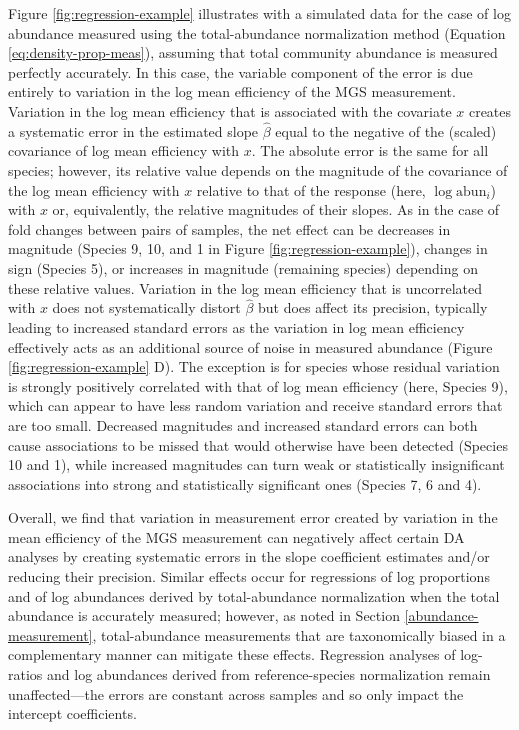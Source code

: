 \documentclass[
]{article}
\begin{document}
Figure \ref{fig:regression-example} illustrates with a simulated data for the case of log abundance measured using the total-abundance normalization method (Equation \eqref{eq:density-prop-meas}), assuming that total community abundance is measured perfectly accurately.
In this case, the variable component of the error is due entirely to variation in the log mean efficiency of the MGS measurement.
Variation in the log mean efficiency that is associated with the covariate \(x\) creates a systematic error in the estimated slope \(\hat \beta\) equal to the negative of the (scaled) covariance of log mean efficiency with \(x\).
The absolute error is the same for all species; however, its relative value depends on the magnitude of the covariance of the log mean efficiency with \(x\) relative to that of the response (here, \(\log \text{abun}_{i}\)) with \(x\) or, equivalently, the relative magnitudes of their slopes.
As in the case of fold changes between pairs of samples, the net effect can be decreases in magnitude (Species 9, 10, and 1 in Figure \ref{fig:regression-example}), changes in sign (Species 5), or increases in magnitude (remaining species) depending on these relative values.
Variation in the log mean efficiency that is uncorrelated with \(x\) does not systematically distort \(\hat \beta\) but does affect its precision, typically leading to increased standard errors as the variation in log mean efficiency effectively acts as an additional source of noise in measured abundance (Figure \ref{fig:regression-example} D).
The exception is for species whose residual variation is strongly positively correlated with that of log mean efficiency (here, Species 9), which can appear to have less random variation and receive standard errors that are too small.
Decreased magnitudes and increased standard errors can both cause associations to be missed that would otherwise have been detected (Species 10 and 1), while increased magnitudes can turn weak or statistically insignificant associations into strong and statistically significant ones (Species 7, 6 and 4).

Overall, we find that variation in measurement error created by variation in the mean efficiency of the MGS measurement can negatively affect certain DA analyses by creating systematic errors in the slope coefficient estimates and/or reducing their precision.
Similar effects occur for regressions of log proportions and of log abundances derived by total-abundance normalization when the total abundance is accurately measured; however, as noted in Section \ref{abundance-measurement}, total-abundance measurements that are taxonomically biased in a complementary manner can mitigate these effects.
Regression analyses of log-ratios and log abundances derived from reference-species normalization remain unaffected---the errors are constant across samples and so only impact the intercept coefficients.
\end{document}
